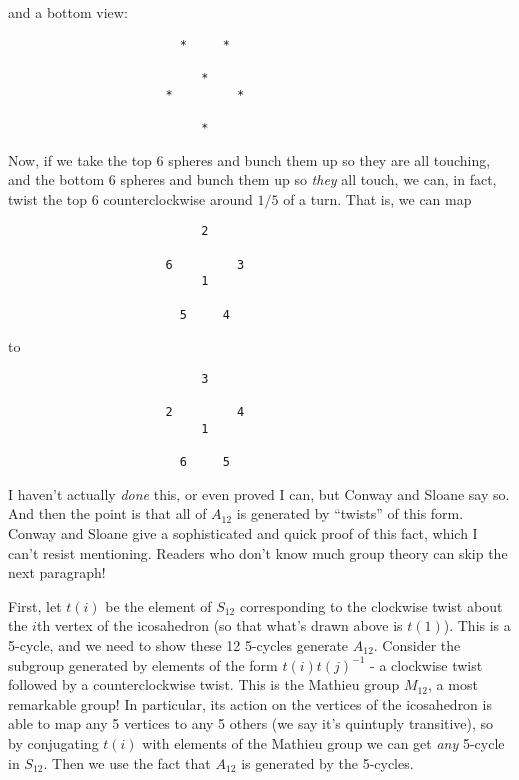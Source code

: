 \documentclass{article}
\begin{document}
and a bottom view:

\begin{verbatim}
                        *     *

                           *
                      *         *  
                    
                           *
\end{verbatim}

Now, if we take the top 6 spheres and bunch them up so they are all
touching, and the bottom 6 spheres and bunch them up so \emph{they} all
touch, we can, in fact, twist the top 6 counterclockwise around \(1/5\)
of a turn. That is, we can map

\begin{verbatim}
                           2
 
                      6         3
                           1
                        
                        5     4
\end{verbatim}

to

\begin{verbatim}
                           3
 
                      2         4
                           1
                        
                        6     5
\end{verbatim}

I haven't actually \emph{done} this, or even proved I can, but Conway
and Sloane say so. And then the point is that all of \(A_{12}\) is
generated by ``twists'' of this form. Conway and Sloane give a
sophisticated and quick proof of this fact, which I can't resist
mentioning. Readers who don't know much group theory can skip the next
paragraph!

First, let \(t(i)\) be the element of \(S_{12}\) corresponding to the
clockwise twist about the \(i\)th vertex of the icosahedron (so that
what's drawn above is \(t(1)\)). This is a 5-cycle, and we need to show
these 12 5-cycles generate \(A_{12}\). Consider the subgroup generated
by elements of the form \(t(i)t(j)^{-1}\) - a clockwise twist followed
by a counterclockwise twist. This is the Mathieu group \(M_{12}\), a
most remarkable group! In particular, its action on the vertices of the
icosahedron is able to map any 5 vertices to any 5 others (we say it's
quintuply transitive), so by conjugating \(t(i)\) with elements of the
Mathieu group we can get \emph{any} 5-cycle in \(S_{12}\). Then we use
the fact that \(A_{12}\) is generated by the 5-cycles.
\end{document}
